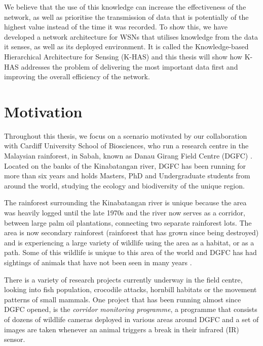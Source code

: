 We believe that the use of this knowledge can increase the effectiveness of the network, as well as prioritise the transmission of data that is potentially of the highest value instead of the time it was recorded. To show this, we have developed a network architecture for WSNs that utilises knowledge from the data it senses, as well as its deployed environment. It is called the Knowledge-based Hierarchical Architecture for Sensing (K-HAS)  and this thesis will show how K-HAS addresses the problem of delivering the most important data first and improving the overall efficiency of the network.

\section{Motivation}\label{int:mot}
Throughout this thesis, we focus on a scenario motivated by our collaboration with Cardiff University School of Biosciences, who run a research centre in the Malaysian rainforest, in Sabah, known as Danau Girang Field Centre (DGFC)  \cite{dgfc}. Located on the banks of the Kinabatangan river, DGFC has been running for more than six years and holds Masters, PhD and Undergraduate students from around the world, studying the ecology and biodiversity of the unique region.

The rainforest surrounding the Kinabatangan river is unique because the area was heavily logged until the late 1970s and the river now serves as a corridor, between large palm oil plantations, connecting two separate rainforest lots. The area is now secondary rainforest (rainforest that has grown since being destroyed) and is experiencing a large variety of wildlife using the area as a habitat, or as a path. Some of this wildlife is unique to this area of the world and DGFC has had sightings of animals that have not been seen in many years \cite{Goossens2012}.

There is a variety of research projects currently underway in the field centre, looking into fish population, crocodile attacks, hornbill habitats or the movement patterns of small mammals. One project that has been running almost since DGFC opened, is the \textit{corridor monitoring programme}, a programme that consists of dozens of wildlife cameras deployed in various areas around DGFC and a set of images are taken whenever an animal triggers a break in their infrared (IR)  sensor.


